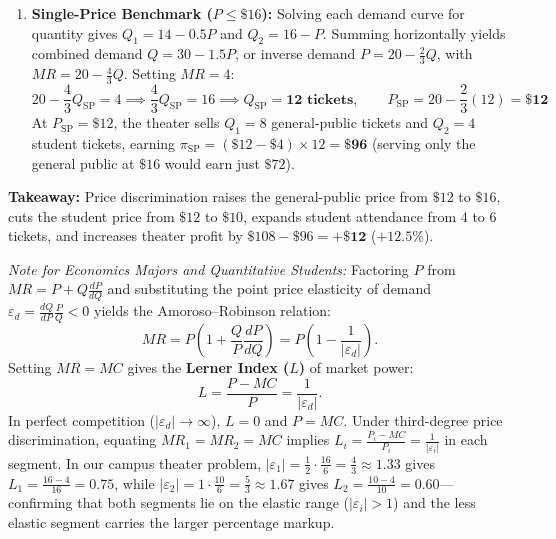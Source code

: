 \documentclass[11pt,letterpaper]{article}
\begin{document}
\begin{tcolorbox}[colback=CourseTeal!6!white,colframe=CourseTeal,title=\textbf{Work It Out: Third-Degree Price Discrimination at a Campus Theater}]
\begin{enumerate}
    \item \textbf{Single-Price Benchmark ($P \le \$16$):}
    Solving each demand curve for quantity gives $Q_1 = 14 - 0.5P$ and $Q_2 = 16 - P$. Summing horizontally yields combined demand $Q = 30 - 1.5P$, or inverse demand $P = 20 - \frac{2}{3}Q$, with $MR = 20 - \frac{4}{3}Q$. Setting $MR = 4$:
    \[
    20 - \frac{4}{3}Q_{\text{SP}} = 4 \implies \frac{4}{3}Q_{\text{SP}} = 16 \implies Q_{\text{SP}} = \mathbf{12\text{ tickets}}, \qquad P_{\text{SP}} = 20 - \frac{2}{3}(12) = \mathbf{\$12}
    \]
    At $P_{\text{SP}} = \$12$, the theater sells $Q_1 = 8$ general-public tickets and $Q_2 = 4$ student tickets, earning $\pi_{\text{SP}} = (\$12 - \$4) \times 12 = \mathbf{\$96}$ (serving only the general public at $\$16$ would earn just $\$72$).
\end{enumerate}
\textbf{Takeaway:} Price discrimination raises the general-public price from $\$12$ to $\$16$, cuts the student price from $\$12$ to $\$10$, expands student attendance from $4$ to $6$ tickets, and increases theater profit by $\$108 - \$96 = \mathbf{+\$12}$ ($+12.5\%$).
\end{tcolorbox}

\begin{tcolorbox}[colback=CourseBlue!6!white,colframe=CourseBlue,title=\textbf{Optional Advanced Calculus: The Lerner Index and Inverse-Elasticity Pricing}]
\small
\emph{Note for Economics Majors and Quantitative Students:}
Factoring $P$ from $MR = P + Q\frac{dP}{dQ}$ and substituting the point price elasticity of demand $\varepsilon_d = \frac{dQ}{dP}\frac{P}{Q} < 0$ yields the Amoroso--Robinson relation:
\[
MR = P\left(1 + \frac{Q}{P}\frac{dP}{dQ}\right) = P\left(1 - \frac{1}{|\varepsilon_d|}\right).
\]
Setting $MR = MC$ gives the \textbf{Lerner Index ($L$)} of market power:
\[
L = \frac{P - MC}{P} = \frac{1}{|\varepsilon_d|}.
\]
In perfect competition ($|\varepsilon_d| \to \infty$), $L = 0$ and $P = MC$. Under third-degree price discrimination, equating $MR_1 = MR_2 = MC$ implies $L_i = \frac{P_i - MC}{P_i} = \frac{1}{|\varepsilon_i|}$ in each segment. In our campus theater problem, $|\varepsilon_1| = \frac{1}{2}\cdot\frac{16}{6} = \frac{4}{3} \approx 1.33$ gives $L_1 = \frac{16-4}{16} = 0.75$, while $|\varepsilon_2| = 1\cdot\frac{10}{6} = \frac{5}{3} \approx 1.67$ gives $L_2 = \frac{10-4}{10} = 0.60$---confirming that both segments lie on the elastic range ($|\varepsilon_i| > 1$) and the less elastic segment carries the larger percentage markup.
\end{tcolorbox}
\end{document}
